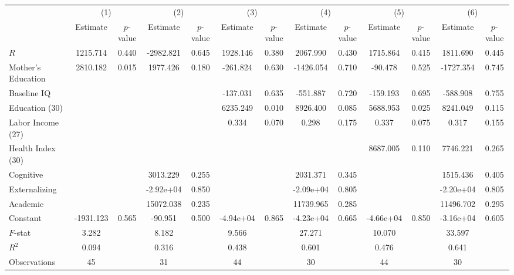 \begin{table}[htbp]
\begin{tabular}{lcccccccccccc} \toprule
 & \multicolumn{2}{c}{(1)}  &  \multicolumn{2}{c}{(2)}  &  \multicolumn{2}{c}{(3)}  &  \multicolumn{2}{c}{(4)}  & \multicolumn{2}{c}{(5)} & \multicolumn{2}{c}{(6)} \\  
 & Estimate & $p$-value & Estimate & $p$-value & Estimate & $p$-value & Estimate & $p$-value & Estimate & $p$-value & Estimate & $p$-value \\ \midrule
$R$ &  1215.714 &     0.440 & -2982.821 &     0.645 &  1928.146 &     0.380 &  2067.990 &     0.430 &  1715.864 &     0.415 &  1811.690 &     0.445 \\  
Mother's Education &  2810.182 &     0.015 &  1977.426 &     0.180 &  -261.824 &     0.630 & -1426.054 &     0.710 &   -90.478 &     0.525 & -1727.354 &     0.745 \\  
Baseline IQ &         &         &         &         &  -137.031 &     0.635 &  -551.887 &     0.720 &  -159.193 &     0.695 &  -588.908 &     0.755 \\  
Education (30) &         &         &         &         &  6235.249 &     0.010 &  8926.400 &     0.085 &  5688.953 &     0.025 &  8241.049 &     0.115 \\  
Labor Income (27) &         &         &         &         &     0.334 &     0.070 &     0.298 &     0.175 &     0.337 &     0.075 &     0.317 &     0.155 \\  
Health Index (30) &         &         &         &         &         &         &         &         &  8687.005 &     0.110 &  7746.221 &     0.265 \\  
Cognitive &         &         &  3013.229 &     0.255 &         &         &  2031.371 &     0.345 &         &         &  1515.436 &     0.405 \\  
Externalizing &         &         & -2.92e+04 &     0.850 &         &         & -2.09e+04 &     0.805 &         &         & -2.20e+04 &     0.805 \\  
Academic &         &         & 15072.038 &     0.235 &         &         & 11739.965 &     0.285 &         &         & 11496.702 &     0.295 \\  
Constant & -1931.123 &     0.565 &   -90.951 &     0.500 & -4.94e+04 &     0.865 & -4.23e+04 &     0.665 & -4.66e+04 &     0.850 & -3.16e+04 &     0.605 \\  \midrule
$F$-stat &     3.282 &         &     8.182 &         &     9.566 &         &    27.271 &         &    10.070 &         &    33.597 &         \\  
$R^2$ &     0.094 &         &     0.316 &         &     0.438 &         &     0.601 &         &     0.476 &         &     0.641 &         \\  
Observations &    45 &         &    31 &         &    44 &         &    30 &         &    44 &         &    30 &         \\  
\bottomrule \end{tabular}
\end{table}
